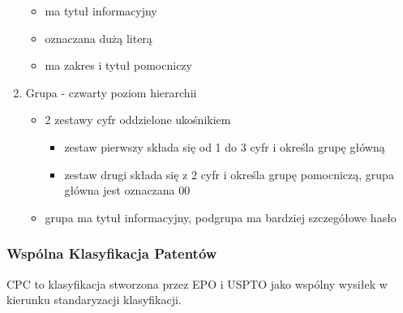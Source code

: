 \begin{enumerate}
\begin{itemize}
        \item ma tytuł informacyjny
        \item oznaczana dużą literą
        \item ma zakres i tytuł pomocniczy
    \end{itemize}
    \item Grupa - czwarty poziom hierarchii
    \begin{itemize}
        \item 2 zestawy cyfr oddzielone ukośnikiem
        \begin{itemize}
            \item zestaw pierwszy składa się od 1 do 3 cyfr i określa grupę główną
            \item zestaw drugi składa się z 2 cyfr i określa grupę pomocniczą, grupa główna jest oznaczana 00
        \end{itemize}
        \item grupa ma tytuł informacyjny, podgrupa ma bardziej szczegółowe hasło
    \end{itemize}
\end{enumerate}



\subsubsection{Wspólna Klasyfikacja Patentów}

\ac{CPC} to klasyfikacja stworzona przez \ac{EPO} i \ac{USPTO}
jako wspólny wysiłek w kierunku standaryzacji klasyfikacji.


